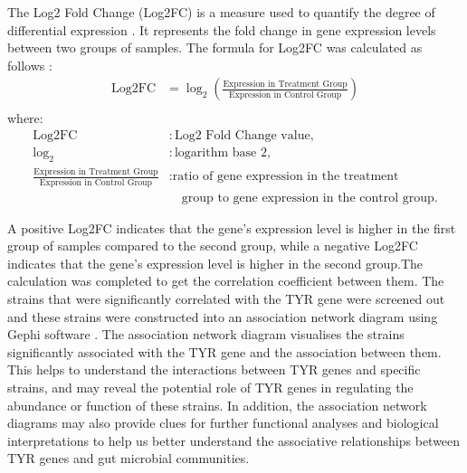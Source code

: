 \documentclass[12pt]{article}
\begin{document}
The Log2 Fold Change (Log2FC) is a measure used to quantify the degree of differential expression \citep{erhard2018estimating}. It represents the fold change in gene expression levels between two groups of samples. The formula for Log2FC was calculated as follows \citep{erhard2018estimating}:
\begin{align*}
\text{Log2FC} & = \log_2 \left( \frac{\text{Expression in Treatment Group}}{\text{Expression in Control Group}} \right) \\
\end{align*}
where:
\begin{align*}
\text{Log2FC} & : \text{Log2 Fold Change value}, \\
\log_2 & : \text{logarithm base 2}, \\
\frac{\text{Expression in Treatment Group}}{\text{Expression in Control Group}} & : \text{ratio of gene expression in the treatment} \\
& \quad \text{group to gene expression in the control group}.
\end{align*}



A positive Log2FC indicates that the gene's expression level is higher in the first group of samples compared to the second group, while a negative Log2FC indicates that the gene's expression level is higher in the second group.The calculation was completed to get the correlation coefficient between them. The strains that were significantly correlated with the TYR gene were screened out and these strains were constructed into an association network diagram using Gephi software \citep{bastian2009gephi}. The association network diagram visualises the strains significantly associated with the TYR gene and the association between them. This helps to understand the interactions between TYR genes and specific strains, and may reveal the potential role of TYR genes in regulating the abundance or function of these strains. In addition, the association network diagrams may also provide clues for further functional analyses and biological interpretations to help us better understand the associative relationships between TYR genes and gut microbial communities.\\\\
\end{document}
